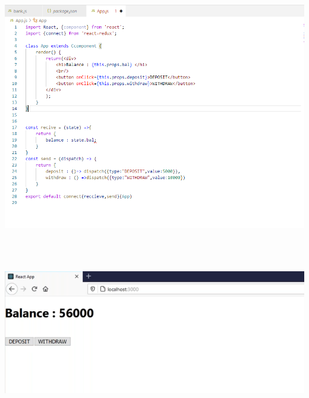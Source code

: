 \documentclass{article}
\begin{document}
\begin{center}
	\noindent \includegraphics*[width=6.25in, height=4.65in]{IMG-11-08}
\end{center}

\noindent 

\noindent 

\noindent 

\begin{center}
	\noindent \includegraphics*[width=6.22in, height=2.53in]{IMG-11-09}
\end{center}
\end{document}
